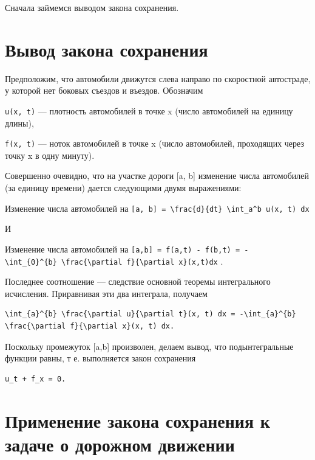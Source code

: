\documentclass[
  ukrainian,
]{article}
\begin{document}
Сначала займемся выводом закона сохранения.

\section{Вывод закона
сохранения}\label{ux432ux44bux432ux43eux434-ux437ux430ux43aux43eux43dux430-ux441ux43eux445ux440ux430ux43dux435ux43dux438ux44f}

Предположим, что автомобили движутся слева направо по скоростной
автостраде, у которой нет боковых съездов и въездов. Обозначим

\texttt{u(x,\ t)} --- плотность автомобилей в точке x (число автомобилей
на единицу длины),

\texttt{f(x,\ t)} --- ноток автомобилей в точке x (число автомобилей,
проходящих через точку x в одну минуту).

Совершенно очевидно, что на участке дороги {[}a, b{]} изменение числа
автомобилей (за единицу времени) дается следующими двумя выражениями:

Изменение числа автомобилей на
\texttt{{[}a,\ b{]}\ =\ \textbackslash{}frac\{d\}\{dt\}\ \textbackslash{}int\_a\^{}b\ u(x,\ t)\ dx}

И

Изменение числа автомобилей на
\texttt{{[}a,b{]}\ =\ f(a,t)\ -\ f(b,t)\ =\ -\textbackslash{}int\_\{0\}\^{}\{b\}\ \textbackslash{}frac\{\textbackslash{}partial\ f\}\{\textbackslash{}partial\ x\}(x,t)dx}
.

Последнее соотношение --- следствие основной теоремы интегрального
исчисления. Приравнивая эти два интеграла, получаем

\begin{verbatim}
\int_{a}^{b} \frac{\partial u}{\partial t}(x, t) dx = -\int_{a}^{b} \frac{\partial f}{\partial x}(x, t) dx.
\end{verbatim}

Поскольку промежуток {[}a,b{]} произволен, делаем вывод, что
подынтегральные функции равны, т е. выполняется закон сохранения

\begin{verbatim}
u_t + f_x = 0.
\end{verbatim}

\section{Применение закона сохранения к задаче о дорожном
движении}\label{ux43fux440ux438ux43cux435ux43dux435ux43dux438ux435-ux437ux430ux43aux43eux43dux430-ux441ux43eux445ux440ux430ux43dux435ux43dux438ux44f-ux43a-ux437ux430ux434ux430ux447ux435-ux43e-ux434ux43eux440ux43eux436ux43dux43eux43c-ux434ux432ux438ux436ux435ux43dux438ux438}
\end{document}
